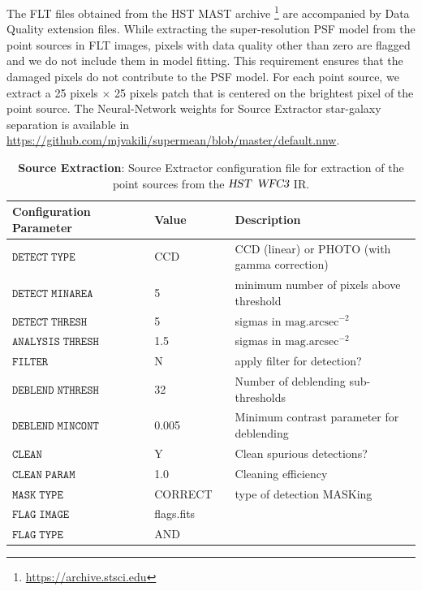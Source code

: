 The FLT files obtained from the HST MAST archive \footnote{\url{https://archive.stsci.edu}} are accompanied by Data Quality extension files. 
While extracting the super-resolution PSF model from the point sources in FLT images, pixels with data quality other than zero are flagged and we do not include them in model fitting. This requirement ensures that the damaged pixels do not contribute to the PSF model. For each point source, we extract a 25 pixels $\times$ 25 pixels patch that is centered on the brightest pixel of the point source. The Neural-Network weights for Source Extractor star-galaxy separation is available in \url{https://github.com/mjvakili/supermean/blob/master/default.nnw}.

\clearpage

\begin{table}
\begin{center}
  \label{tab:sextractor}
  \caption{{\bf Source Extraction}: Source Extractor configuration file for extraction of the point sources from the ${\textsl{HST}}$ ${\textsl{WFC3}}$ IR.}
\begin{tabular}{@{}lllll}
\\ \hline 
    Configuration Parameter & & Value & &  Description\\ \hline
  $\mathtt{DETECT \; TYPE}$ & & CCD & &  CCD (linear) or PHOTO (with gamma correction) \\
  $\mathtt{DETECT \; MINAREA}$ & & 5 & &  minimum number of pixels above threshold \\
  $\mathtt{DETECT \; THRESH}$ & & 5 & &  sigmas in $\mathrm{mag.arcsec}^{-2}$ \\
  $\mathtt{ANALYSIS \; THRESH}$ & & 1.5 & & sigmas in $\mathrm{mag.arcsec}^{-2}$  \\
  $\mathtt{FILTER}$ & & N & &  apply filter for detection?\\ 
  $\mathtt{DEBLEND \;  NTHRESH}$ & & 32 & &  Number of deblending sub-thresholds \\
  $\mathtt{DEBLEND \; MINCONT}$ & & 0.005 & &  Minimum contrast parameter for deblending \\
  $\mathtt{CLEAN}$ & & Y & &  Clean spurious detections?\\
  $\mathtt{CLEAN \; PARAM}$ & & 1.0 & & Cleaning efficiency \\
  $\mathtt{MASK \; TYPE}$ & & CORRECT & &  type of detection MASKing \\
  $\mathtt{FLAG \; IMAGE}$ & & flags.fits & &   \\
  $\mathtt{FLAG \; TYPE}$ & & AND & &   \\

\end{tabular}
\end{center}
\end{table}
